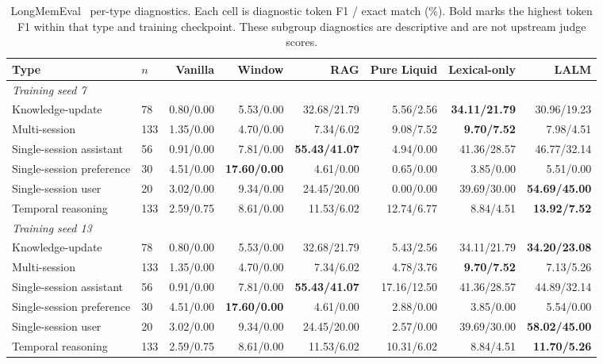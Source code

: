 \documentclass[conference]{IEEEtran}
\begin{document}
\begin{table}[t]
\centering
\scriptsize
\caption{LongMemEval~\cite{wu2024longmemeval} per-type diagnostics. Each cell is diagnostic token
F1 / exact match (\%). Bold marks the highest token F1 within that type and
training checkpoint. These subgroup diagnostics are descriptive and are not
upstream judge scores.}
\label{tab:longmemeval-types}
\begin{tabular}{llrrrrrr}
\toprule
Type & $n$ & Vanilla & Window & RAG & Pure Liquid & Lexical-only & LALM\\
\midrule
\multicolumn{8}{l}{\emph{Training seed 7}}\\
Knowledge-update & 78 & 0.80/0.00 & 5.53/0.00 & 32.68/21.79 & 5.56/2.56 & \textbf{34.11/21.79} & 30.96/19.23\\
Multi-session & 133 & 1.35/0.00 & 4.70/0.00 & 7.34/6.02 & 9.08/7.52 & \textbf{9.70/7.52} & 7.98/4.51\\
Single-session assistant & 56 & 0.91/0.00 & 7.81/0.00 & \textbf{55.43/41.07} & 4.94/0.00 & 41.36/28.57 & 46.77/32.14\\
Single-session preference & 30 & 4.51/0.00 & \textbf{17.60/0.00} & 4.61/0.00 & 0.65/0.00 & 3.85/0.00 & 5.51/0.00\\
Single-session user & 20 & 3.02/0.00 & 9.34/0.00 & 24.45/20.00 & 0.00/0.00 & 39.69/30.00 & \textbf{54.69/45.00}\\
Temporal reasoning & 133 & 2.59/0.75 & 8.61/0.00 & 11.53/6.02 & 12.74/6.77 & 8.84/4.51 & \textbf{13.92/7.52}\\
\midrule
\multicolumn{8}{l}{\emph{Training seed 13}}\\
Knowledge-update & 78 & 0.80/0.00 & 5.53/0.00 & 32.68/21.79 & 5.43/2.56 & 34.11/21.79 & \textbf{34.20/23.08}\\
Multi-session & 133 & 1.35/0.00 & 4.70/0.00 & 7.34/6.02 & 4.78/3.76 & \textbf{9.70/7.52} & 7.13/5.26\\
Single-session assistant & 56 & 0.91/0.00 & 7.81/0.00 & \textbf{55.43/41.07} & 17.16/12.50 & 41.36/28.57 & 44.89/32.14\\
Single-session preference & 30 & 4.51/0.00 & \textbf{17.60/0.00} & 4.61/0.00 & 2.88/0.00 & 3.85/0.00 & 5.54/0.00\\
Single-session user & 20 & 3.02/0.00 & 9.34/0.00 & 24.45/20.00 & 2.57/0.00 & 39.69/30.00 & \textbf{58.02/45.00}\\
Temporal reasoning & 133 & 2.59/0.75 & 8.61/0.00 & 11.53/6.02 & 10.31/6.02 & 8.84/4.51 & \textbf{11.70/5.26}\\
\bottomrule
\end{tabular}
\end{table}
\end{document}
